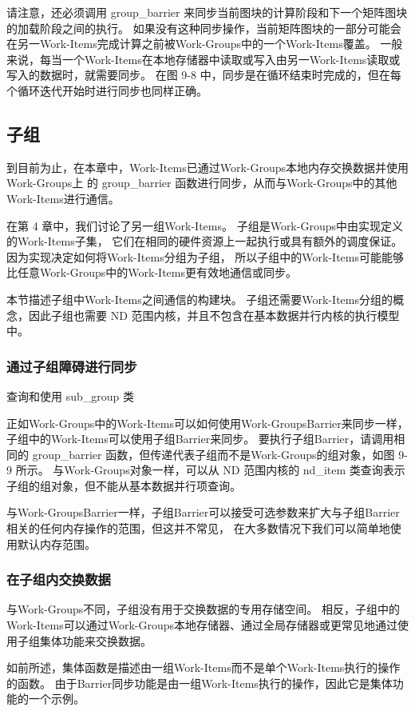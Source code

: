 请注意，还必须调用 group\_barrier 来同步当前图块的计算阶段和下一个矩阵图块的加载阶段之间的执行。 
如果没有这种同步操作，当前矩阵图块的一部分可能会在另一Work-Items完成计算之前被Work-Groups中的一个Work-Items覆盖。 
一般来说，每当一个Work-Items在本地存储器中读取或写入由另一Work-Items读取或写入的数据时，就需要同步。 
在图 9-8 中，同步是在循环结束时完成的，但在每个循环迭代开始时进行同步也同样正确。

\subsection{子组}
到目前为止，在本章中，Work-Items已通过Work-Groups本地内存交换数据并使用Work-Groups上
的 group\_barrier 函数进行同步，从而与Work-Groups中的其他Work-Items进行通信。

在第 4 章中，我们讨论了另一组Work-Items。 子组是Work-Groups中由实现定义的Work-Items子集，
它们在相同的硬件资源上一起执行或具有额外的调度保证。 
因为实现决定如何将Work-Items分组为子组，
所以子组中的Work-Items可能能够比任意Work-Groups中的Work-Items更有效地通信或同步。

本节描述子组中Work-Items之间通信的构建块。 
子组还需要Work-Items分组的概念，因此子组也需要 ND 范围内核，并且不包含在基本数据并行内核的执行模型中。

\subsubsection{通过子组障碍进行同步}
{\color{red} 查询和使用 sub\_group 类}

正如Work-Groups中的Work-Items可以如何使用Work-GroupsBarrier来同步一样，子组中的Work-Items可以使用子组Barrier来同步。 
要执行子组Barrier，请调用相同的 group\_barrier 函数，但传递代表子组而不是Work-Groups的组对象，如图 9-9 所示。 
与Work-Groups对象一样，可以从 ND 范围内核的 nd\_item 类查询表示子组的组对象，但不能从基本数据并行项查询。

与Work-GroupsBarrier一样，子组Barrier可以接受可选参数来扩大与子组Barrier相关的任何内存操作的范围，但这并不常见，
在大多数情况下我们可以简单地使用默认内存范围。

\subsubsection{在子组内交换数据}
与Work-Groups不同，子组没有用于交换数据的专用存储空间。 
相反，子组中的Work-Items可以通过Work-Groups本地存储器、通过全局存储器或更常见地通过使用子组集体功能来交换数据。

如前所述，集体函数是描述由一组Work-Items而不是单个Work-Items执行的操作的函数。 
由于Barrier同步功能是由一组Work-Items执行的操作，因此它是集体功能的一个示例。

